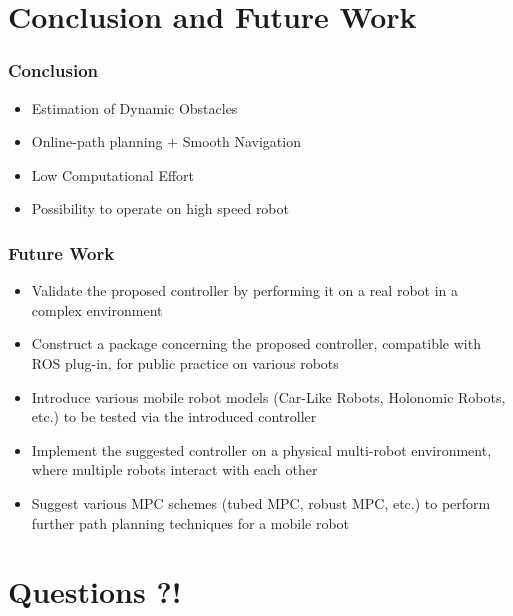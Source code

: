 \section{Conclusion and Future Work}
	
	\begin{frame}
		\frametitle{Conclusion}
		\pause
		\begin{itemize}
			\item Estimation of Dynamic Obstacles \\ [0.5cm]
			\pause
			\item Online-path planning + Smooth Navigation \\ [0.5cm]
			\pause
			\item Low Computational Effort \\ [0.5cm]
			\pause
			\item Possibility to operate on high speed robot
		\end{itemize}
	\end{frame}
	
	\begin{frame}
		\frametitle{Future Work}
		\pause
		\begin{itemize}
			\item Validate the proposed controller by performing it on a real robot in a complex environment \\ [0.5cm]
			\pause
			\item Construct a package concerning the proposed controller, compatible with ROS plug-in, for public practice on various robots \\ [0.5cm]
			\pause
			\item Introduce various mobile robot models (Car-Like Robots, Holonomic Robots, etc.) to be tested via the introduced controller \\ [0.5cm]
			\pause
			\item Implement the suggested controller on a physical multi-robot environment, where multiple robots interact with each other \\ [0.5cm]
			\pause
			\item Suggest various MPC schemes (tubed MPC, robust MPC, etc.) to perform further path planning techniques for a mobile robot
		\end{itemize}
	\end{frame}

\section{Questions ?!}